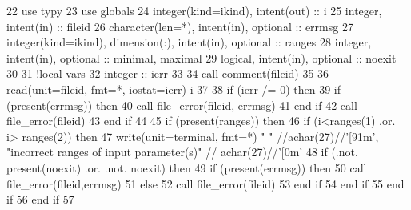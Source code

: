 \begin{DoxyCode}
22       \textcolor{keywordtype}{use }typy
23       \textcolor{keywordtype}{use }globals
24       \textcolor{keywordtype}{integer(kind=ikind)}, \textcolor{keywordtype}{intent(out)} :: i
25       \textcolor{keywordtype}{integer}, \textcolor{keywordtype}{intent(in)} :: fileid
26       \textcolor{keywordtype}{character(len=*)}, \textcolor{keywordtype}{intent(in)}, \textcolor{keywordtype}{optional} :: errmsg
27       \textcolor{keywordtype}{integer(kind=ikind)}, \textcolor{keywordtype}{dimension(:)}, \textcolor{keywordtype}{intent(in)},  \textcolor{keywordtype}{optional} :: ranges
28       \textcolor{keywordtype}{integer}, \textcolor{keywordtype}{intent(in)}, \textcolor{keywordtype}{optional} :: minimal, maximal
29       \textcolor{keywordtype}{logical}, \textcolor{keywordtype}{intent(in)}, \textcolor{keywordtype}{optional} :: noexit
30 
31       \textcolor{comment}{!local vars}
32       \textcolor{keywordtype}{integer} :: ierr
33 
34       \textcolor{keyword}{call }comment(fileid)
35 
36       \textcolor{keyword}{read}(unit=fileid, fmt=*, iostat=ierr) i
37 
38       \textcolor{keywordflow}{if} (ierr /= 0) \textcolor{keywordflow}{then}
39         \textcolor{keywordflow}{if} (\textcolor{keyword}{present}(errmsg)) \textcolor{keywordflow}{then}
40           \textcolor{keyword}{call }file_error(fileid, errmsg)
41 \textcolor{keywordflow}{        end if}
42         \textcolor{keyword}{call }file_error(fileid)
43 \textcolor{keywordflow}{      end if}
44 
45       \textcolor{keywordflow}{if} (\textcolor{keyword}{present}(ranges)) \textcolor{keywordflow}{then}
46         \textcolor{keywordflow}{if} (i<ranges(1) .or. i> ranges(2)) \textcolor{keywordflow}{then}
47           \textcolor{keyword}{write}(unit=terminal, fmt=*) \textcolor{stringliteral}{" "} //achar(27)//\textcolor{stringliteral}{'[91m'}, \textcolor{stringliteral}{"incorrect ranges of input parameter(s)"}\textcolor{comment}{ //
      achar(27)//}\textcolor{stringliteral}{'[0m'}
48           \textcolor{keywordflow}{if} (.not. \textcolor{keyword}{present}(noexit) .or. .not. noexit) \textcolor{keywordflow}{then}
49             \textcolor{keywordflow}{if} (\textcolor{keyword}{present}(errmsg)) \textcolor{keywordflow}{then}
50               \textcolor{keyword}{call }file_error(fileid,errmsg)
51             \textcolor{keywordflow}{else}
52               \textcolor{keyword}{call }file_error(fileid)
53 \textcolor{keywordflow}{            end if}
54 \textcolor{keywordflow}{          end if}
55 \textcolor{keywordflow}{        end if}
56 \textcolor{keywordflow}{      end if}
57 
\end{DoxyCode}


